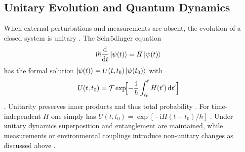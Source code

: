 \subsection{Unitary Evolution and Quantum Dynamics}

When external perturbations and measurements are absent, the evolution of a closed system is unitary \cite{NielsenChuang2010}.  
The Schrödinger equation  
\begin{equation}
  \mathrm i\hbar\frac{\mathrm d}{\mathrm dt}\ket{\psi(t)} = H\ket{\psi(t)}
\end{equation} \cite{Schrodinger1926}
has the formal solution $\ket{\psi(t)}=U(t,t_0)\ket{\psi(t_0)}$ with
\begin{equation}
  U(t,t_0)=\mathcal T\exp\!\Bigl[-\frac{\mathrm i}{\hbar}\int_{t_0}^{t} H(t')\,\mathrm dt'\Bigr]
\end{equation} \cite{Sakurai1994}.
Unitarity preserves inner products and thus total probability \cite{NielsenChuang2010}.  
For time-independent $H$ one simply has $U(t,t_0)=\exp[-\mathrm iH(t-t_0)/\hbar]$ \cite{Sakurai1994}.  
Under unitary dynamics superposition and entanglement are maintained, while measurements or environmental couplings introduce non-unitary changes as discussed above \cite{NielsenChuang2010}.  
